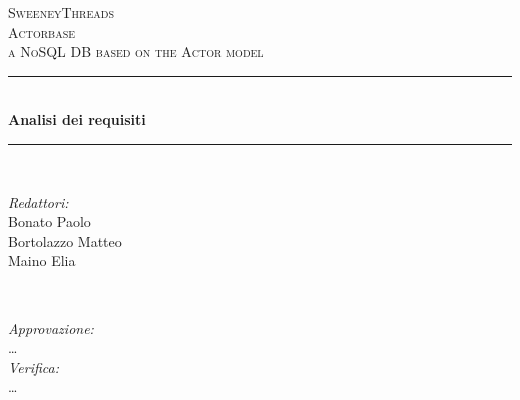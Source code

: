 \documentclass[a4paper]{report}
\begin{document}
	
	\begin{titlepage}
		\newcommand{\HRule}{\rule{\linewidth}{0.5mm}} 
		\center  
		
		\textsc{\LARGE SweeneyThreads}\\[1.5cm] 
		\textsc{\Large Actorbase}\\[0.5cm] 
		\textsc{\large a NoSQL DB based on the Actor model}\\[0.5cm]
		
		
		\HRule \\[0.4cm]
		{ \huge \bfseries Analisi dei requisiti}\\[0.4cm] 
		\HRule \\[1.5cm]
		
		\begin{minipage}{0.4\textwidth}
			\begin{flushleft} \large
				\emph{Redattori:}\\
				Bonato Paolo \\
				Bortolazzo Matteo \\
				Maino Elia
			\end{flushleft}
		\end{minipage}
		~
		\begin{minipage}{0.4\textwidth}
			\begin{flushright} \large
				\emph{Approvazione:} \\
				\dots \\
				\emph{Verifica:} \\
				\dots
			\end{flushright}
		\end{minipage}
		

\end{titlepage}
\end{document}
